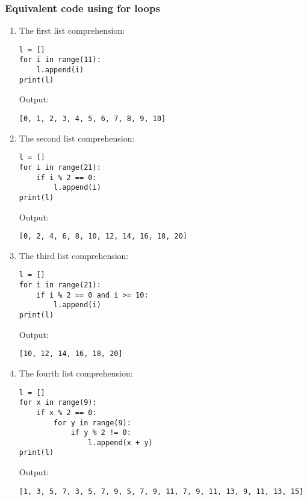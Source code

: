 \documentclass[11pt]{article}
\begin{document}
\subsubsection{Equivalent code using for loops}
\label{sec:orgb8d40aa}
\begin{enumerate}
\item The first list comprehension:
\begin{verbatim}
l = []
for i in range(11):
    l.append(i)
print(l)
\end{verbatim}

 \noindent Output:

\label{orgecc5548}
\begin{verbatim}
[0, 1, 2, 3, 4, 5, 6, 7, 8, 9, 10]
\end{verbatim}

\item The second list comprehension:
\begin{verbatim}
l = []
for i in range(21):
    if i % 2 == 0:
        l.append(i)
print(l)
\end{verbatim}

 \noindent Output:

\label{org5fde132}
\begin{verbatim}
[0, 2, 4, 6, 8, 10, 12, 14, 16, 18, 20]
\end{verbatim}

\item The third list comprehension:
\begin{verbatim}
l = []
for i in range(21):
    if i % 2 == 0 and i >= 10:
        l.append(i)
print(l)
\end{verbatim}

 \noindent Output:

\label{orgba88e36}
\begin{verbatim}
[10, 12, 14, 16, 18, 20]
\end{verbatim}


 \newpage

\item The fourth list comprehension:
\begin{verbatim}
l = []
for x in range(9):
    if x % 2 == 0:
        for y in range(9):
            if y % 2 != 0:
                l.append(x + y)
print(l)
\end{verbatim}

 \noindent Output:

\label{orga361a49}
\begin{verbatim}
[1, 3, 5, 7, 3, 5, 7, 9, 5, 7, 9, 11, 7, 9, 11, 13, 9, 11, 13, 15]
\end{verbatim}
\end{enumerate}
\end{document}

